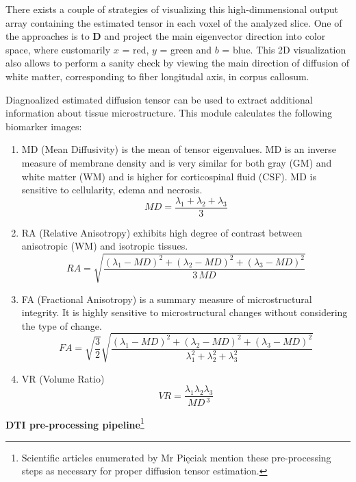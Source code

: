 There exists a couple of strategies of visualizing this high-dimmensional output array containing the estimated tensor in each voxel of the analyzed slice. One of the approaches is to $\boldsymbol{D}$ and project the main eigenvector direction into color space, where customarily $x$ = red, $y$ = green and $b$ = blue. This 2D visualization also allows to perform a sanity check by viewing the main direction of diffusion of white matter, corresponding to fiber longitudal axis, in corpus callosum.

Diagnoalized estimated diffusion tensor can be used to extract additional information about tissue microstructure. This module calculates the following biomarker images:
\begin{enumerate}
	\item MD (Mean Diffusivity) is the mean of tensor eigenvalues. MD is an inverse measure of membrane density and is very similar for both gray (GM) and white matter (WM) and is higher for corticospinal fluid (CSF). MD is sensitive to cellularity, edema and necrosis.
	\begin{equation}
	MD = \dfrac{\lambda_{1}+\lambda_{2}+\lambda_{3}}{3}
	\label{Eq:dti_eq_4}
	\end{equation}
	\item RA (Relative Anisotropy) exhibits high degree of contrast between anisotropic (WM) and isotropic tissues.
	\begin{equation}
	RA = \sqrt{\dfrac{\left(\lambda_{1}-MD\right)^2+\left(\lambda_{2}-MD\right)^2+\left(\lambda_{3}-MD\right)^2}{3\,MD}}
	\label{Eq:dti_eq_5}
	\end{equation}
	\item FA (Fractional Anisotropy) is a summary measure of microstructural integrity. It is highly sensitive to microstructural changes without considering the type of change.
	\begin{equation}
	FA = \sqrt{\dfrac{3}{2}}\sqrt{\dfrac{\left(\lambda_{1}-MD\right)^2+\left(\lambda_{2}-MD\right)^2+\left(\lambda_{3}-MD\right)^2}{\lambda_{1}^2+\lambda_{2}^2+\lambda_{3}^2}}
	\label{Eq:dti_eq_6}
	\end{equation}
	\item VR (Volume Ratio)
	\begin{equation}
	VR = \frac{\lambda_{1}\lambda_{2}\lambda_{3}}{MD\,^3}
	\label{Eq:dti_eq_7}
	\end{equation}
\end{enumerate}

\hfill\newline
\textbf{DTI pre-processing pipeline}\footnote{Scientific articles enumerated by Mr Pięciak mention these pre-processing steps as necessary for proper diffusion tensor estimation.}

